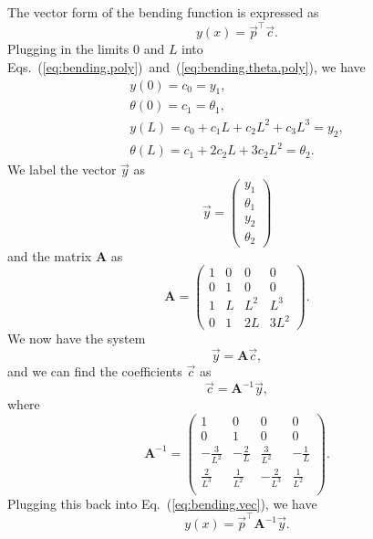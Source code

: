 The vector form of the bending function is expressed as
\begin{equation}
y(x) = \vec{p}^\top\vec{c}.
\label{eq:bending.vec}
\end{equation}
Plugging in the limits $0$ and $L$ into Eqs.~(\ref{eq:bending.poly})~and~(\ref{eq:bending.theta.poly}), we have
\begin{eqnarray}
y(0) = c_0 = y_1,\\
\theta(0) = c_1 = \theta_1, \\
y(L) = c_0+c_1L+c_2L^2+c_3L^3 = y_2, \\
\theta(L) = c_1+2c_2L+3c_2L^2 = \theta_2.
\end{eqnarray}
We label the vector $\vec{y}$ as
\begin{equation}
\vec{y} = 
\begin{pmatrix}
y_1 \\
\theta_1 \\
y_2 \\
\theta_2
\end{pmatrix}
\label{eq:bending.vector.y}
\end{equation}
and the matrix $\mathbf A$ as
\begin{equation}
\mathbf{A} = 
\begin{pmatrix}
1 & 0 & 0 & 0 \\
0 & 1 & 0 & 0 \\
1 & L & L^2 & L^3 \\
0 & 1 & 2L & 3L^2
\end{pmatrix}.
\end{equation}
We now have the system
\begin{equation}
\vec{y} = \mathbf{A}\vec{c},
\end{equation}
and we can find the coefficients $\vec{c}$ as
\begin{equation}
\vec{c} = \mathbf{A}^{-1}\vec{y},
\end{equation}
where
\begin{equation}
\mathbf{A}^{-1} = 
\begin{pmatrix}
1 & 0 & 0 & 0 \\
0 & 1 & 0 & 0 \\
-\frac{3}{L^2} & -\frac{2}{L} & \frac{3}{L^2} & -\frac{1}{L} \\
\frac{2}{L^3} & \frac{1}{L^2} & -\frac{2}{L^3} & \frac{1}{L^2} \\
\end{pmatrix}.
\end{equation}
Plugging this back into Eq.~(\ref{eq:bending.vec}), we have
\begin{equation}
y(x) = \vec{p}^\top\mathbf{A}^{-1}\vec{y}.
\end{equation}
